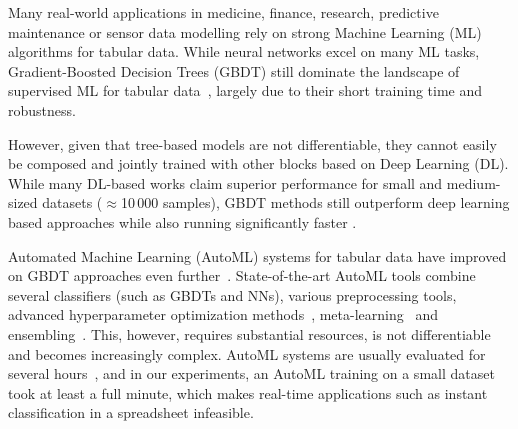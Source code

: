 Many real-world applications in medicine, finance, research, predictive maintenance or sensor data modelling rely on strong Machine Learning (ML) algorithms for tabular data. 
%
While neural networks excel on many ML tasks, Gradient-Boosted Decision Trees (GBDT) still dominate the landscape of supervised ML for tabular data~\citep{GBDT,nnsfortabular2}, largely due to their short training time and robustness.

However, given that tree-based models are not differentiable, they cannot easily be composed and jointly trained with other blocks based on Deep Learning (DL).
While many DL-based works claim superior performance for small and medium-sized datasets ($\approx$10\,000 samples), GBDT methods still outperform deep learning based approaches while also running significantly faster \citep{grinsztajn2022why}.

Automated Machine Learning (AutoML) systems for tabular data have improved on GBDT approaches even 
further~\citep{thornton-kdd13a,hutter-book19a,erickson-arxiv20a}. %
State-of-the-art AutoML tools combine several classifiers (such as GBDTs and NNs), various preprocessing tools, advanced hyperparameter optimization methods~\citep{falkner-icml18a}, meta-learning~\citep{feurer-aaai15a,yang-kdd19a} and ensembling~\citep{escalante-jmlr09a,feurer-nips15a,olson-gecco16a,feurer-arxiv20v2,erickson-arxiv20a}. This, however, requires substantial resources, is not differentiable and becomes increasingly complex.
AutoML systems are usually evaluated for several hours~\citep{gijsbers-automl2019,amlb}, and in our experiments, an AutoML training on a small dataset took at least a full minute, which makes real-time applications such as instant classification in a spreadsheet infeasible.

